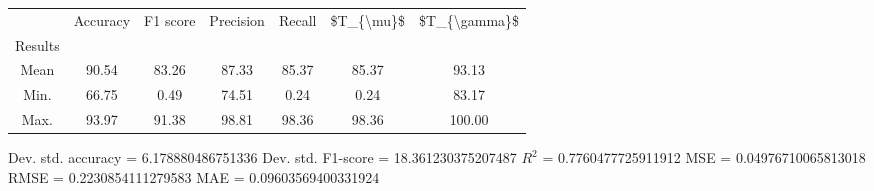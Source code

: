 \begin{tabular}{|c|c|c|c|c|c|c|}
\toprule
{} &  Accuracy &  F1 score &  Precision &  Recall &  \$T\_\{\textbackslash mu\}\$ &  \$T\_\{\textbackslash gamma\}\$ \\
Results &           &           &            &         &            &               \\
\hline
Mean    &     90.54 &     83.26 &      87.33 &   85.37 &      85.37 &         93.13 \\
Min.    &     66.75 &      0.49 &      74.51 &    0.24 &       0.24 &         83.17 \\
Max.    &     93.97 &     91.38 &      98.81 &   98.36 &      98.36 &        100.00 \\
\bottomrule
\end{tabular}

 Dev. std. accuracy = 6.178880486751336
 Dev. std. F1-score = 18.361230375207487
 $R^2$ = 0.7760477725911912
 MSE = 0.04976710065813018
 RMSE = 0.2230854111279583
 MAE = 0.09603569400331924